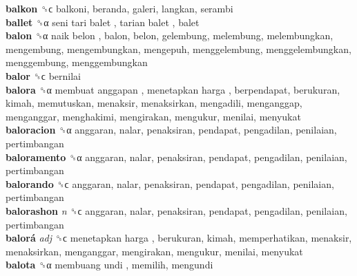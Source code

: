 \textbf{balkon} ␝ϲ  balkoni, beranda, galeri, langkan, serambi  \\
\textbf{ballet} ␝α   seni tari balet ,  tarian balet , balet  \\
\textbf{balon} ␝α   naik belon , balon, belon, gelembung, melembung, melembungkan, mengembung, mengembungkan, mengepuh, menggelembung, menggelembungkan, menggembung, menggembungkan  \\
\textbf{balor} ␝ϲ  bernilai  \\
\textbf{balora} ␝α   membuat anggapan ,  menetapkan harga , berpendapat, berukuran, kimah, memutuskan, menaksir, menaksirkan, mengadili, menganggap, menganggar, menghakimi, mengirakan, mengukur, menilai, menyukat  \\
\textbf{baloracion} ␝α  anggaran, nalar, penaksiran, pendapat, pengadilan, penilaian, pertimbangan  \\
\textbf{baloramento} ␝α  anggaran, nalar, penaksiran, pendapat, pengadilan, penilaian, pertimbangan  \\
\textbf{balorando} ␝ϲ  anggaran, nalar, penaksiran, pendapat, pengadilan, penilaian, pertimbangan  \\
\textbf{balorashon} \emph{n}  ␝ϲ  anggaran, nalar, penaksiran, pendapat, pengadilan, penilaian, pertimbangan  \\
\textbf{balorá} \emph{adj}  ␝ϲ   menetapkan harga , berukuran, kimah, memperhatikan, menaksir, menaksirkan, menganggar, mengirakan, mengukur, menilai, menyukat  \\
\textbf{balota} ␝α   membuang undi , memilih, mengundi  \\
